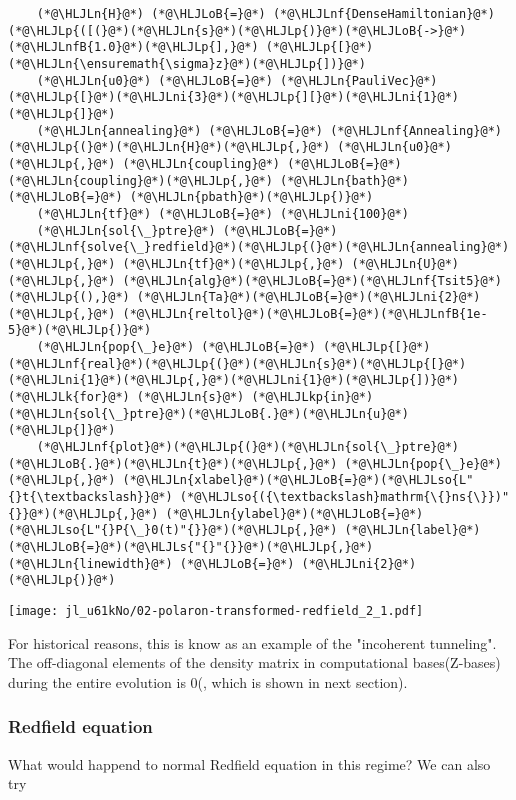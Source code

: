 \documentclass[12pt,a4paper]{article}
\newcommand{\HLJLk}[1]{\textcolor[RGB]{148,91,176}{\textbf{#1}}}
\newcommand{\HLJLkp}[1]{\textcolor[RGB]{148,91,176}{\textbf{#1}}}
\newcommand{\HLJLn}[1]{#1}
\newcommand{\HLJLnf}[1]{\textcolor[RGB]{66,102,213}{#1}}
\newcommand{\HLJLs}[1]{\textcolor[RGB]{201,61,57}{#1}}
\newcommand{\HLJLso}[1]{\textcolor[RGB]{201,61,57}{#1}}
\newcommand{\HLJLnfB}[1]{\textcolor[RGB]{59,151,46}{#1}}
\newcommand{\HLJLni}[1]{\textcolor[RGB]{59,151,46}{#1}}
\newcommand{\HLJLoB}[1]{\textcolor[RGB]{102,102,102}{\textbf{#1}}}
\newcommand{\HLJLp}[1]{#1}
\begin{document}
\begin{lstlisting}
    (*@\HLJLn{H}@*) (*@\HLJLoB{=}@*) (*@\HLJLnf{DenseHamiltonian}@*)(*@\HLJLp{([(}@*)(*@\HLJLn{s}@*)(*@\HLJLp{)}@*)(*@\HLJLoB{->}@*)(*@\HLJLnfB{1.0}@*)(*@\HLJLp{],}@*) (*@\HLJLp{[}@*)(*@\HLJLn{\ensuremath{\sigma}z}@*)(*@\HLJLp{])}@*)
    (*@\HLJLn{u0}@*) (*@\HLJLoB{=}@*) (*@\HLJLn{PauliVec}@*)(*@\HLJLp{[}@*)(*@\HLJLni{3}@*)(*@\HLJLp{][}@*)(*@\HLJLni{1}@*)(*@\HLJLp{]}@*)
    (*@\HLJLn{annealing}@*) (*@\HLJLoB{=}@*) (*@\HLJLnf{Annealing}@*)(*@\HLJLp{(}@*)(*@\HLJLn{H}@*)(*@\HLJLp{,}@*) (*@\HLJLn{u0}@*)(*@\HLJLp{,}@*) (*@\HLJLn{coupling}@*) (*@\HLJLoB{=}@*) (*@\HLJLn{coupling}@*)(*@\HLJLp{,}@*) (*@\HLJLn{bath}@*) (*@\HLJLoB{=}@*) (*@\HLJLn{pbath}@*)(*@\HLJLp{)}@*)
    (*@\HLJLn{tf}@*) (*@\HLJLoB{=}@*) (*@\HLJLni{100}@*)
    (*@\HLJLn{sol{\_}ptre}@*) (*@\HLJLoB{=}@*) (*@\HLJLnf{solve{\_}redfield}@*)(*@\HLJLp{(}@*)(*@\HLJLn{annealing}@*)(*@\HLJLp{,}@*) (*@\HLJLn{tf}@*)(*@\HLJLp{,}@*) (*@\HLJLn{U}@*)(*@\HLJLp{,}@*) (*@\HLJLn{alg}@*)(*@\HLJLoB{=}@*)(*@\HLJLnf{Tsit5}@*)(*@\HLJLp{(),}@*) (*@\HLJLn{Ta}@*)(*@\HLJLoB{=}@*)(*@\HLJLni{2}@*)(*@\HLJLp{,}@*) (*@\HLJLn{reltol}@*)(*@\HLJLoB{=}@*)(*@\HLJLnfB{1e-5}@*)(*@\HLJLp{)}@*)
    (*@\HLJLn{pop{\_}e}@*) (*@\HLJLoB{=}@*) (*@\HLJLp{[}@*)(*@\HLJLnf{real}@*)(*@\HLJLp{(}@*)(*@\HLJLn{s}@*)(*@\HLJLp{[}@*)(*@\HLJLni{1}@*)(*@\HLJLp{,}@*)(*@\HLJLni{1}@*)(*@\HLJLp{])}@*) (*@\HLJLk{for}@*) (*@\HLJLn{s}@*) (*@\HLJLkp{in}@*) (*@\HLJLn{sol{\_}ptre}@*)(*@\HLJLoB{.}@*)(*@\HLJLn{u}@*)(*@\HLJLp{]}@*)
    (*@\HLJLnf{plot}@*)(*@\HLJLp{(}@*)(*@\HLJLn{sol{\_}ptre}@*)(*@\HLJLoB{.}@*)(*@\HLJLn{t}@*)(*@\HLJLp{,}@*) (*@\HLJLn{pop{\_}e}@*)(*@\HLJLp{,}@*) (*@\HLJLn{xlabel}@*)(*@\HLJLoB{=}@*)(*@\HLJLso{L"{}t{\textbackslash}}@*) (*@\HLJLso{({\textbackslash}mathrm{\{}ns{\}})"{}}@*)(*@\HLJLp{,}@*) (*@\HLJLn{ylabel}@*)(*@\HLJLoB{=}@*)(*@\HLJLso{L"{}P{\_}0(t)"{}}@*)(*@\HLJLp{,}@*) (*@\HLJLn{label}@*)(*@\HLJLoB{=}@*)(*@\HLJLs{"{}"{}}@*)(*@\HLJLp{,}@*) (*@\HLJLn{linewidth}@*) (*@\HLJLoB{=}@*) (*@\HLJLni{2}@*)(*@\HLJLp{)}@*)
\end{lstlisting}

\texttt{[image: jl\_u61kNo/02-polaron-transformed-redfield\_2\_1.pdf]}

For historical reasons, this is know as an example of the "incoherent tunneling". The off-diagonal elements of the density matrix in computational bases(Z-bases) during the entire evolution is 0(, which is shown in next section).

\subsubsection{Redfield equation}
What would happend to normal Redfield equation in this regime? We can also try
\end{document}
